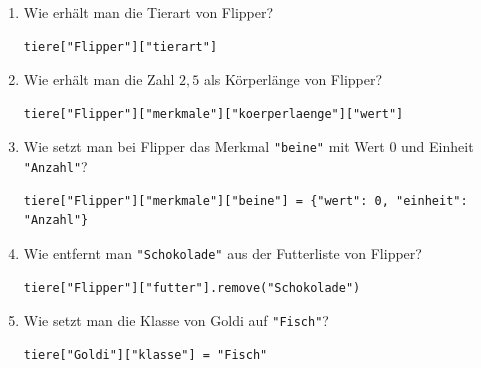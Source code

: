 \begin{enumerate}[label=\alph*)]
\item Wie erhält man die Tierart von Flipper?
\ifdefined\zeigloesungen
\begin{tcolorbox}[colback=loesungbg,colframe=loesungframe,fonttitle=\bfseries\small,title=L{\"o}sung,left=4pt,right=4pt,top=2pt,bottom=2pt,before skip=4pt,after skip=4pt,]
\begin{lstlisting}[style=python]
tiere["Flipper"]["tierart"]
\end{lstlisting}
\end{tcolorbox}
\fi

\item Wie erhält man die Zahl $2{,}5$ als Körperlänge von Flipper?
\ifdefined\zeigloesungen
\begin{tcolorbox}[colback=loesungbg,colframe=loesungframe,fonttitle=\bfseries\small,title=L{\"o}sung,left=4pt,right=4pt,top=2pt,bottom=2pt,before skip=4pt,after skip=4pt,]
\begin{lstlisting}[style=python]
tiere["Flipper"]["merkmale"]["koerperlaenge"]["wert"]
\end{lstlisting}
\end{tcolorbox}
\fi

\item Wie setzt man bei Flipper das Merkmal \lstinline|"beine"| mit Wert 0 und Einheit \lstinline|"Anzahl"|?
\ifdefined\zeigloesungen
\begin{tcolorbox}[colback=loesungbg,colframe=loesungframe,fonttitle=\bfseries\small,title=L{\"o}sung,left=4pt,right=4pt,top=2pt,bottom=2pt,before skip=4pt,after skip=4pt,]
\begin{lstlisting}[style=python]
tiere["Flipper"]["merkmale"]["beine"] = {"wert": 0, "einheit": "Anzahl"}
\end{lstlisting}
\end{tcolorbox}
\fi

\item Wie entfernt man \lstinline|"Schokolade"| aus der Futterliste von Flipper?
\ifdefined\zeigloesungen
\begin{tcolorbox}[colback=loesungbg,colframe=loesungframe,fonttitle=\bfseries\small,title=L{\"o}sung,left=4pt,right=4pt,top=2pt,bottom=2pt,before skip=4pt,after skip=4pt,]
\begin{lstlisting}[style=python]
tiere["Flipper"]["futter"].remove("Schokolade")
\end{lstlisting}
\end{tcolorbox}
\fi

\item Wie setzt man die Klasse von Goldi auf \lstinline|"Fisch"|?
\ifdefined\zeigloesungen
\begin{tcolorbox}[colback=loesungbg,colframe=loesungframe,fonttitle=\bfseries\small,title=L{\"o}sung,left=4pt,right=4pt,top=2pt,bottom=2pt,before skip=4pt,after skip=4pt,]
\begin{lstlisting}[style=python]
tiere["Goldi"]["klasse"] = "Fisch"
\end{lstlisting}
\end{tcolorbox}
\fi
\end{enumerate}

